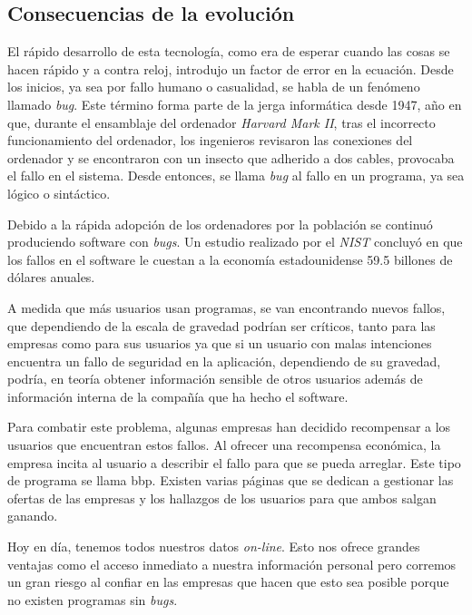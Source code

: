 \documentclass[titlepage, 12pt, a4paper]{article}
\begin{document}
\subsection{Consecuencias de la evolución}
El rápido desarrollo de esta tecnología, como era de esperar cuando las cosas se hacen rápido y a contra reloj, introdujo un factor de error en la ecuación. Desde los inicios, ya sea por fallo humano o casualidad, se habla de un fenómeno llamado \textit{\Gls{bug}}. Este término forma parte de la jerga informática desde 1947, año en que, durante el ensamblaje del ordenador \textit{Harvard Mark II}, tras el incorrecto funcionamiento del ordenador, los ingenieros revisaron las conexiones del ordenador y se encontraron con un insecto que adherido a dos cables, provocaba el fallo en el sistema. Desde entonces, se llama \textit{\Gls{bug}} al fallo en un programa, ya sea lógico o sintáctico.\par Debido a la rápida adopción de los ordenadores por la población se continuó produciendo software con \textit{\Gls{bug}s}. Un estudio realizado por el \textit{\Gls{NIST}} concluyó en que los fallos en el software le cuestan a la economía estadounidense 59.5 billones de dólares anuales.\cite{NIST}\par A medida que más usuarios usan programas, se van encontrando nuevos fallos, que dependiendo de la escala de gravedad podrían ser críticos, tanto para las empresas como para sus usuarios ya que si un usuario con malas intenciones encuentra un fallo de seguridad en la aplicación, dependiendo de su gravedad, podría, en teoría obtener información sensible de otros usuarios además de información interna de la compañía que ha hecho el software.\par Para combatir este problema, algunas empresas han decidido recompensar a los usuarios que encuentran estos fallos. Al ofrecer una recompensa económica, la empresa incita al usuario a describir el fallo para que se pueda arreglar. Este tipo de programa se llama \Gls{bbp}. Existen varias páginas que se dedican a gestionar las ofertas de las empresas y los hallazgos de los usuarios para que ambos salgan ganando.\par Hoy en día, tenemos todos nuestros datos \textit{on-line}. Esto nos ofrece grandes ventajas como el acceso inmediato a nuestra información personal pero corremos un gran riesgo al confiar en las empresas que hacen que esto sea posible porque no existen programas sin  \textit{\Gls{bug}s}.
\end{document}
